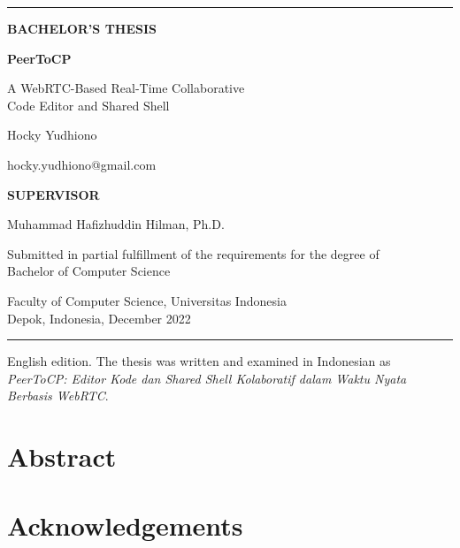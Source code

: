 \documentclass[11pt,a4paper,oneside]{report}
\begin{document}
\begin{titlepage}
  \sffamily
  {\color{accent}\rule{\linewidth}{2pt}}\par
  \vspace{2.2cm}
  {\small\color{accent}\textbf{BACHELOR'S THESIS}\par}
  \vspace{0.5cm}
  {\fontsize{34}{40}\selectfont\bfseries PeerToCP\par}
  \vspace{0.4cm}
  {\fontsize{18}{24}\selectfont A WebRTC-Based Real-Time Collaborative\\ Code Editor and Shared Shell\par}
  \vspace{2.5cm}
  {\Large Hocky Yudhiono\par}
  \vspace{0.3cm}
  {\color{rulegray}hocky.yudhiono@gmail.com\par}
  \vfill
  {\small\color{accent}\textbf{SUPERVISOR}\par}
  \vspace{0.15cm}
  Muhammad Hafizhuddin Hilman, Ph.D.\par
  \vspace{1cm}
  Submitted in partial fulfillment of the requirements for the degree of\\
  Bachelor of Computer Science\par
  \vspace{0.3cm}
  Faculty of Computer Science, Universitas Indonesia\\
  Depok, Indonesia, December 2022\par
  \vspace{1cm}
  {\color{accent}\rule{\linewidth}{0.5pt}}\par
  \vspace{0.2cm}
  {\footnotesize\color{rulegray} English edition. The thesis was written and examined in Indonesian as
  \emph{PeerToCP: Editor Kode dan Shared Shell Kolaboratif dalam Waktu Nyata Berbasis WebRTC}.\par}
\end{titlepage}


\chapter*{Abstract}


\chapter*{Acknowledgements}

\end{document}
